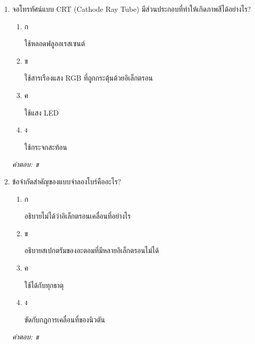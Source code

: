 \documentclass[12pt]{article}
\begin{document}
\begin{enumerate}[label=\arabic*., itemsep=0.5\baselineskip, topsep=0.5\baselineskip, leftmargin=*]
\item จอโทรทัศน์แบบ CRT (Cathode Ray Tube) มีส่วนประกอบที่ทำให้เกิดภาพสีได้อย่างไร?
\begin{enumerate}[label=\alph*)., itemsep=0.3\baselineskip, topsep=0.3\baselineskip]
\item ก\ 
\begin{minipage}[t]{0.9\linewidth}
\raggedright ใช้หลอดฟลูออเรสเซนต์
\end{minipage}
\item ข\ 
\begin{minipage}[t]{0.9\linewidth}
\raggedright ใช้สารเรืองแสง RGB ที่ถูกกระตุ้นด้วยอิเล็กตรอน
\end{minipage}
\item ค\ 
\begin{minipage}[t]{0.9\linewidth}
\raggedright ใช้แสง LED
\end{minipage}
\item ง\ 
\begin{minipage}[t]{0.9\linewidth}
\raggedright ใช้กระจกสะท้อน
\end{minipage}
\end{enumerate}
\vspace{-0.3\baselineskip}
\begin{small}
\textit{คำตอบ: ข}
\end{small}

\item ข้อจำกัดสำคัญของแบบจำลองโบร์คืออะไร?
\begin{enumerate}[label=\alph*)., itemsep=0.3\baselineskip, topsep=0.3\baselineskip]
\item ก\ 
\begin{minipage}[t]{0.9\linewidth}
\raggedright อธิบายไม่ได้ว่าอิเล็กตรอนเคลื่อนที่อย่างไร
\end{minipage}
\item ข\ 
\begin{minipage}[t]{0.9\linewidth}
\raggedright อธิบายสเปกตรัมของอะตอมที่มีหลายอิเล็กตรอนไม่ได้
\end{minipage}
\item ค\ 
\begin{minipage}[t]{0.9\linewidth}
\raggedright ใช้ได้กับทุกธาตุ
\end{minipage}
\item ง\ 
\begin{minipage}[t]{0.9\linewidth}
\raggedright ขัดกับกฎการเคลื่อนที่ของนิวตัน
\end{minipage}
\end{enumerate}
\vspace{-0.3\baselineskip}
\begin{small}
\textit{คำตอบ: ข}
\end{small}


\end{enumerate}
\end{document}
